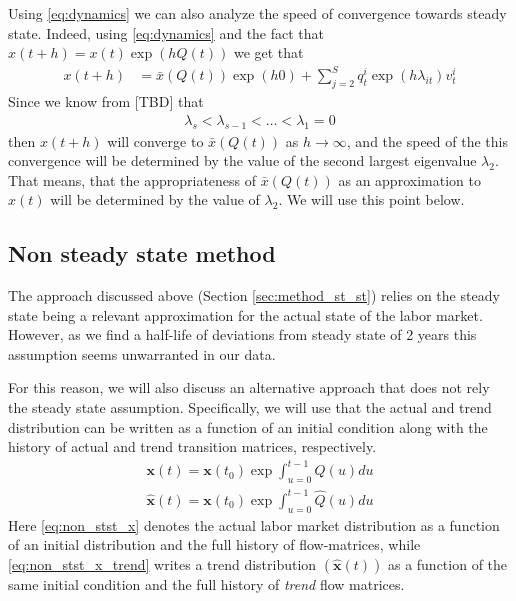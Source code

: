 Using \eqref{eq:dynamics} we can also analyze the speed of convergence towards steady state. Indeed, using \eqref{eq:dynamics} and the fact that $x(t+h)=x(t)\exp(hQ(t))$ we get that 
\begin{align}
x(t+h)&=\bar{x} (Q(t)) \exp (h0) +\sum_{j=2}^S q_t^i \exp(h\lambda_{it}) v_t^i
\end{align}
Since we know from [TBD] that 
\begin{align}
\lambda_s<\lambda_{s-1}<\dots<\lambda_{1}=0
\end{align}
then $x(t+h)$ will converge to $\bar{x} (Q(t))$ as $h \rightarrow \infty$, and the speed of the this convergence will be determined by the value of the second largest eigenvalue $\lambda_2$. That means, that the appropriateness of $\bar{x}(Q(t))$ as an approximation to $x(t)$ will be determined by the value of $\lambda_2$. We will use this point below.


\subsection{Non steady state method}
\label{sec:method_non_st_st}

The approach discussed above (Section \ref{sec:method_st_st}) relies on the steady state being a relevant approximation for the actual state of the labor market. However, as we find a half-life of deviations from steady state of 2 years this assumption seems unwarranted in our data.

For this reason, we will also discuss an alternative approach that does not rely the steady state assumption.  Specifically, we will use that the actual and trend distribution can be written as a function of an initial condition along with the history of actual and trend transition matrices, respectively. 
\begin{align}
	\mathbf{x}(t)=\mathbf{x}(t_0) \exp{\int_{u=0}^{t-1} Q(u) du} \label{eq:non_stst_x} \\
	\mathbf{\hat{x}}(t)=\mathbf{x}(t_0) \exp{\int_{u=0}^{t-1} \hat Q(u) du} \label{eq:non_stst_x_trend}
\end{align}
Here \eqref{eq:non_stst_x} denotes the actual labor market distribution as a function of an initial distribution and the full history of flow-matrices, while \eqref{eq:non_stst_x_trend} writes a trend distribution $(\mathbf{\hat{x}}(t))$ as a function of the same initial condition and the full history of \emph{trend} flow matrices.

